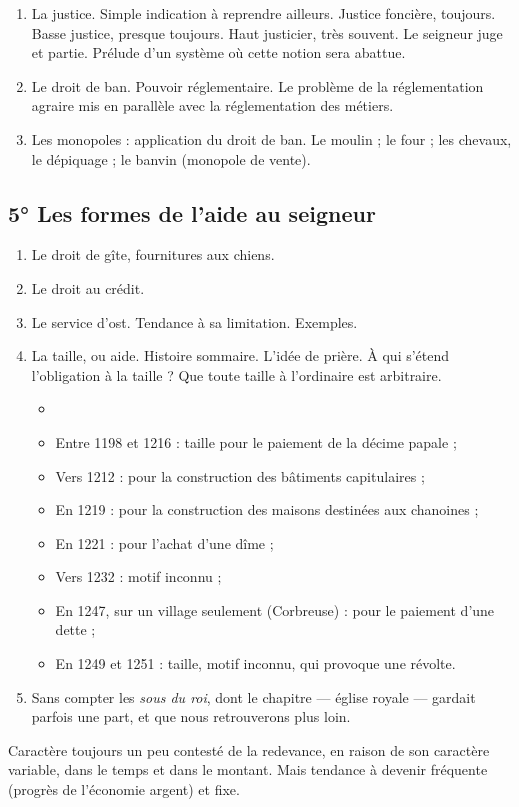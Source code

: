\documentclass[french,twoside]{book} %
\begin{document}
\begin{enumerate}[itemsep=0pt,]
\item La justice. Simple indication à reprendre ailleurs. Justice foncière, toujours. Basse justice, presque toujours. Haut justicier, très souvent. Le seigneur juge et partie. Prélude d’un système où cette notion sera abattue.
\item Le droit de ban. Pouvoir réglementaire. Le problème de la réglementation agraire mis en parallèle avec la réglementation des métiers.
\item Les monopoles : application du droit de ban. Le moulin ; le four ; les chevaux, le dépiquage ; le banvin (monopole de vente).

\end{enumerate}\subsection[5° Les formes de l’aide au seigneur]{5° Les formes de l’aide au seigneur}

\begin{enumerate}[itemsep=\baselineskip,]
\item Le droit de gîte, fournitures aux chiens.
\item Le droit au crédit.
\item Le service d’ost. Tendance à sa limitation. Exemples.
\item La taille, ou aide. Histoire sommaire. L’idée de prière. À qui s’étend l’obligation à la taille ? Que toute taille à l’ordinaire est arbitraire.\par

\begin{itemize}[itemsep=0pt,]
\item[] \hspace{-1.5em}{\bfseries Exemples de Notre-Dame de Paris :}
\item Entre 1198 et 1216 : taille pour le paiement de la décime papale ;
\item Vers 1212 : pour la construction des bâtiments capitulaires ;
\item En 1219 : pour la construction des maisons destinées aux chanoines ;
\item En 1221 : pour l’achat d’une dîme ;
\item Vers 1232 : motif inconnu ;
\item En 1247, sur un village seulement (Corbreuse) : pour le paiement d’une dette ;
\item En 1249 et 1251 : taille, motif inconnu, qui provoque une révolte.
\end{itemize}

\item Sans compter les \emph{sous du roi}, dont le chapitre — église royale — gardait parfois une part, et que nous retrouverons plus loin.

\end{enumerate}\noindent Caractère toujours un peu contesté de la redevance, en raison de son caractère variable, dans le temps et dans le montant. Mais tendance à devenir fréquente (progrès de l’économie argent) et fixe.\par
\end{document}
